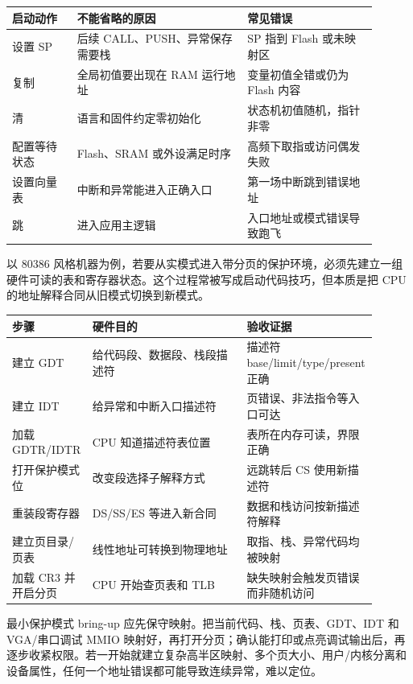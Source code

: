 \begin{longtable}{L{0.16\linewidth}L{0.42\linewidth}L{0.32\linewidth}}
\toprule
启动动作 & 不能省略的原因 & 常见错误 \\
\midrule
设置 SP & 后续 CALL、PUSH、异常保存需要栈 & SP 指到 Flash 或未映射区 \\
复制  & 全局初值要出现在 RAM 运行地址 & 变量初值全错或仍为 Flash 内容 \\
清  & 语言和固件约定零初始化 & 状态机初值随机，指针非零 \\
配置等待状态 & Flash、SRAM 或外设满足时序 & 高频下取指或访问偶发失败 \\
设置向量表 & 中断和异常能进入正确入口 & 第一场中断跳到错误地址 \\
跳  & 进入应用主逻辑 & 入口地址或模式错误导致跑飞 \\
\bottomrule
\end{longtable}

以 80386 风格机器为例，若要从实模式进入带分页的保护环境，必须先建立一组硬件可读的表和寄存器状态。这个过程常被写成启动代码技巧，但本质是把 CPU 的地址解释合同从旧模式切换到新模式。

\begin{longtable}{L{0.16\linewidth}L{0.42\linewidth}L{0.32\linewidth}}
\toprule
步骤 & 硬件目的 & 验收证据 \\
\midrule
建立 GDT & 给代码段、数据段、栈段描述符 & 描述符 base/limit/type/present 正确 \\
建立 IDT & 给异常和中断入口描述符 & 页错误、非法指令等入口可达 \\
加载 GDTR/IDTR & CPU 知道描述符表位置 & 表所在内存可读，界限正确 \\
打开保护模式位 & 改变段选择子解释方式 & 远跳转后 CS 使用新描述符 \\
重装段寄存器 & DS/SS/ES 等进入新合同 & 数据和栈访问按新描述符解释 \\
建立页目录/页表 & 线性地址可转换到物理地址 & 取指、栈、异常代码均被映射 \\
加载 CR3 并开启分页 & CPU 开始查页表和 TLB & 缺失映射会触发页错误而非随机访问 \\
\bottomrule
\end{longtable}

最小保护模式 bring-up 应先保守映射。把当前代码、栈、页表、GDT、IDT 和 VGA/串口调试 MMIO 映射好，再打开分页；确认能打印或点亮调试输出后，再逐步收紧权限。若一开始就建立复杂高半区映射、多个页大小、用户/内核分离和设备属性，任何一个地址错误都可能导致连续异常，难以定位。

